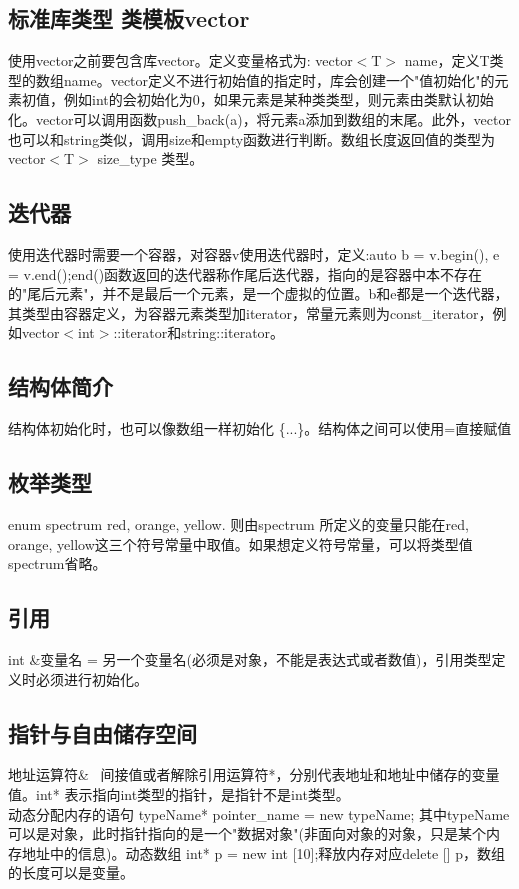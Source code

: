 \documentclass[]{article}
\begin{document}
\subsection{标准库类型 类模板vector}
使用vector之前要包含库vector。定义变量格式为: vector$<$T$>$ name，定义T类型的数组name。vector定义不进行初始值的指定时，库会创建一个"值初始化"的元素初值，例如int的会初始化为0，如果元素是某种类类型，则元素由类默认初始化。vector可以调用函数push\_back(a)，将元素a添加到数组的末尾。此外，vector也可以和string类似，调用size和empty函数进行判断。数组长度返回值的类型为 vector$<$T$>$ size\_type 类型。
\subsection{迭代器}
使用迭代器时需要一个容器，对容器v使用迭代器时，定义:auto b = v.begin(), e = v.end();end()函数返回的迭代器称作尾后迭代器，指向的是容器中本不存在的"尾后元素"，并不是最后一个元素，是一个虚拟的位置。b和e都是一个迭代器，其类型由容器定义，为容器元素类型加iterator，常量元素则为const\_iterator，例如vector$<$int$>$::iterator和string::iterator。
\subsection{结构体简介}
结构体初始化时，也可以像数组一样初始化  \{...\}。结构体之间可以使用=直接赋值    
\subsection{枚举类型}
enum spectrum {red, orange, yellow}. 则由spectrum 所定义的变量只能在red, orange, yellow这三个符号常量中取值。如果想定义符号常量，可以将类型值spectrum省略。
\subsection{引用}
int \&变量名 = 另一个变量名(必须是对象，不能是表达式或者数值)，引用类型定义时必须进行初始化。

\subsection{指针与自由储存空间}
地址运算符\& \ 间接值或者解除引用运算符*，分别代表地址和地址中储存的变量值。int* 表示指向int类型的指针，是指针不是int类型。
\\动态分配内存的语句 typeName* pointer\_name = new typeName; 其中typeName可以是对象，此时指针指向的是一个"数据对象"(非面向对象的对象，只是某个内存地址中的信息)。动态数组 int* p = new int [10];释放内存对应delete [] p，数组的长度可以是变量。
\end{document}
